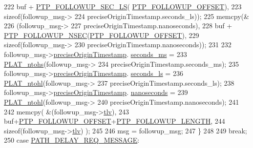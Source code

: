 \begin{DoxyCode}
{{{{{{222                    buf + \hyperlink{avbts__message_8hpp_a470982eacf33272b811d30ffc5643355}{PTP\_FOLLOWUP\_SEC\_LS}(
      \hyperlink{avbts__message_8hpp_af54dd338e8c2b906b028746fbecdb74d}{PTP\_FOLLOWUP\_OFFSET}),
223                    \textcolor{keyword}{sizeof}(followup\_msg->
224                       preciseOriginTimestamp.seconds\_ls));
225             memcpy(&
226                    (followup\_msg->
227                 preciseOriginTimestamp.nanoseconds),
228                    buf + \hyperlink{avbts__message_8hpp_a0cc3e393e41f74bf9befbca3c62cbcdb}{PTP\_FOLLOWUP\_NSEC}(\hyperlink{avbts__message_8hpp_af54dd338e8c2b906b028746fbecdb74d}{PTP\_FOLLOWUP\_OFFSET}),
229                    \textcolor{keyword}{sizeof}(followup\_msg->
230                       preciseOriginTimestamp.nanoseconds));
231 
232             followup\_msg->\hyperlink{class_p_t_p_message_follow_up_ab410646215c0bcbaf124d5923f22e2ca}{preciseOriginTimestamp}.
      \hyperlink{class_timestamp_a5d98378d782519e6f9c17db70f1620f0}{seconds\_ms} =
233                 \hyperlink{linux_2src_2platform_8cpp_a6b8f3e7b87b66fa774a07ddc67f883a7}{PLAT\_ntohs}(followup\_msg->
234                        preciseOriginTimestamp.seconds\_ms);
235             followup\_msg->\hyperlink{class_p_t_p_message_follow_up_ab410646215c0bcbaf124d5923f22e2ca}{preciseOriginTimestamp}.
      \hyperlink{class_timestamp_a2bf200e58cd268d8b86cf93c51500a44}{seconds\_ls} =
236                 \hyperlink{linux_2src_2platform_8cpp_ad335681c3444e0406899693a6f782173}{PLAT\_ntohl}(followup\_msg->
237                        preciseOriginTimestamp.seconds\_ls);
238             followup\_msg->\hyperlink{class_p_t_p_message_follow_up_ab410646215c0bcbaf124d5923f22e2ca}{preciseOriginTimestamp}.
      \hyperlink{class_timestamp_a78ae11d98fcfe738239d0a853d82c84a}{nanoseconds} =
239                 \hyperlink{linux_2src_2platform_8cpp_ad335681c3444e0406899693a6f782173}{PLAT\_ntohl}(followup\_msg->
240                        preciseOriginTimestamp.nanoseconds);
241 
242             memcpy( &(followup\_msg->\hyperlink{class_p_t_p_message_follow_up_adb3aa00a5c7072f30af7374ea54c158c}{tlv}),
243                 buf+\hyperlink{avbts__message_8hpp_af54dd338e8c2b906b028746fbecdb74d}{PTP\_FOLLOWUP\_OFFSET}+\hyperlink{avbts__message_8hpp_a7db8f880133691145b633e681fea9d27}{PTP\_FOLLOWUP\_LENGTH},
244                 \textcolor{keyword}{sizeof}(followup\_msg->\hyperlink{class_p_t_p_message_follow_up_adb3aa00a5c7072f30af7374ea54c158c}{tlv}) );
245 
246             msg = followup\_msg;
247         \}
248 
249         \textcolor{keywordflow}{break};
250     \textcolor{keywordflow}{case} \hyperlink{avbts__message_8hpp_ac6606ebe91c8ac66a2c314c79f5ab013ac4aa576969ecdd82afe82721e94ba36f}{PATH\_DELAY\_REQ\_MESSAGE}:
}}}}}}
\end{DoxyCode}
